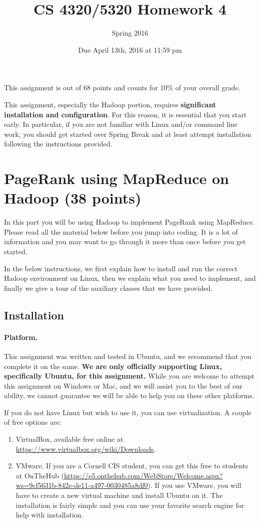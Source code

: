 \documentclass[10pt]{article}
\title{CS 4320/5320 Homework 4}
\author{Spring 2016}
\date{Due April 13th, 2016 at 11:59 pm}
\begin{document}
    \maketitle

This assignment is out of 68 points and counts for 10\% of your overall grade.

This assignment, especially the Hadoop portion, requires \textbf{significant installation and configuration}. For this reason, it is essential that you start early. In particular, if you are not familiar with Linux and/or command line work, you should get started over Spring Break and at least attempt installation following the instructions provided.

\section{PageRank using MapReduce on Hadoop (38 points)}

In this part you will be using Hadoop to implement PageRank using MapReduce. Please read all the material below before you jump into coding. It is a lot of information and you may want to go through it more than once before you get started. 

In the below instructions, we first explain how to install and run the correct Hadoop environment on Linux, then we explain what you need to implement, and finally we give a tour of the auxiliary classes that we have provided.

\subsection{Installation}

\paragraph{Platform.}
This assignment was written and tested in Ubuntu, and we recommend that you complete it on the same. \textbf{We are only officially supporting Linux, specifically Ubuntu, for this assignment.} While you are welcome to attempt this assignment on Windows or Mac, and we will assist you to the best of our ability, we cannot guarantee we will be able to help you on these other platforms.

If you do not have Linux but wish to use it, you can use virtualization. A couple of free options are:

\begin{enumerate}
	\item VirtualBox, available free online at \url{https://www.virtualbox.org/wiki/Downloads}.
	\item VMware. If you are a Cornell CIS student, you can get this free to students at OnTheHub
	(\url{https://e5.onthehub.com/WebStore/Welcome.aspx?ws=9cf5631b-842e-de11-a497-0030485a8df0}). If you use VMware, you will have to create a new virtual machine and install Ubuntu on it. The installation is fairly simple and you can use your favorite search engine for help with installation.
\end{enumerate}
\end{document}
